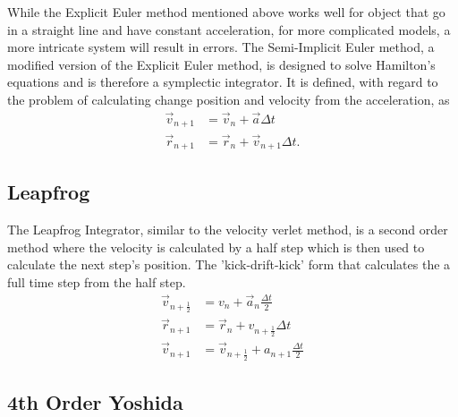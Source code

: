 While the Explicit Euler method mentioned above works well for object that go in a straight line and have constant acceleration, for more complicated models, a more intricate system will result in errors. The Semi-Implicit Euler method, a modified version of the Explicit Euler method, is designed to solve Hamilton's equations and is therefore a symplectic integrator. It is defined, with regard to the problem of calculating change position and velocity from the acceleration, as  
\begin{align*}
\vec{v}_{n+1}&=\vec{v}_n+\vec{a} \Delta t\\
\vec{r}_{n+1}&=\vec{r}_n+\vec{v}_{n+1} \Delta t.
\end{align*}

\subsection{Leapfrog}

The Leapfrog Integrator, similar to the velocity verlet method, is a second order method where the velocity is calculated by a half step which is then used to calculate the next step's position. The 'kick-drift-kick' form that calculates the a full time step from the half step.
\begin{align*}
\vec{v}_{n+\frac{1}{2}}&=v_n+\vec{a}_n \frac{\Delta t}{2}\\
\vec{r}_{n+1}&=\vec{r}_n+v_{n+\frac{1}{2}} \Delta t\\
\vec{v}_{n+1}&=\vec{v}_{n+\frac{1}{2}}+a_{n+1} \frac{\Delta t}{2}
\end{align*}

\subsection{4th Order Yoshida}

